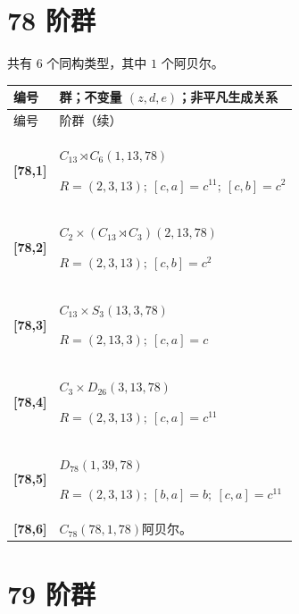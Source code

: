 \documentclass[UTF8,fontset=fandol,11pt,a4paper]{ctexart}
\begin{document}
\section*{78 阶群}\label{order:78}

共有 $6$ 个同构类型，其中 $1$ 个阿贝尔。

\begingroup\small\setlength{\tabcolsep}{3pt}\renewcommand{\arraystretch}{1.12}

\begin{longtable}{@{}p{17mm}>{\raggedright\arraybackslash}p{141mm}@{}}

\toprule 编号 & 群；不变量 $(z,d,e)$；非平凡生成关系\\\midrule\endfirsthead

\toprule 编号 & 78 阶群（续）\\\midrule\endhead\bottomrule\endfoot

\textbf{[78,1]} & $C_{13}\rtimes C_{6}$\quad $(1,13,78)$\par\(R=(2,3,13);\allowbreak\ [c,a]=c^{11};\allowbreak\ [c,b]=c^{2}\)\\[3pt]

\textbf{[78,2]} & $C_{2}\times (C_{13}\rtimes C_{3})$\quad $(2,13,78)$\par\(R=(2,3,13);\allowbreak\ [c,b]=c^{2}\)\\[3pt]

\textbf{[78,3]} & $C_{13}\times S_{3}$\quad $(13,3,78)$\par\(R=(2,13,3);\allowbreak\ [c,a]=c\)\\[3pt]

\textbf{[78,4]} & $C_{3}\times D_{26}$\quad $(3,13,78)$\par\(R=(2,3,13);\allowbreak\ [c,a]=c^{11}\)\\[3pt]

\textbf{[78,5]} & $D_{78}$\quad $(1,39,78)$\par\(R=(2,3,13);\allowbreak\ [b,a]=b;\allowbreak\ [c,a]=c^{11}\)\\[3pt]

\textbf{[78,6]} & $C_{78}$\quad $(78,1,78)$\quad 阿贝尔。\\[3pt]

\end{longtable}\endgroup

\section*{79 阶群}\label{order:79}
\end{document}
